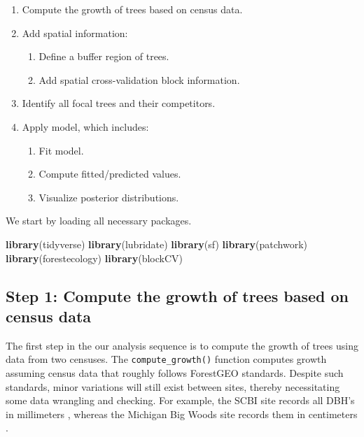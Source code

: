 \documentclass[12pt]{article}
\providecommand{\tightlist}{%
  \setlength{\itemsep}{0pt}\setlength{\parskip}{0pt}}
\newenvironment{Shaded}{\begin{snugshade}}{\end{snugshade}}
\newcommand{\KeywordTok}[1]{\textcolor[rgb]{0.13,0.29,0.53}{\textbf{#1}}}
\newcommand{\NormalTok}[1]{#1}
\begin{document}
\begin{enumerate}
\def\labelenumi{\arabic{enumi}.}
\tightlist
\item
  Compute the growth of trees based on census data.
\item
  Add spatial information:

  \begin{enumerate}
  \def\labelenumii{\arabic{enumii}.}
  \tightlist
  \item
    Define a buffer region of trees.
  \item
    Add spatial cross-validation block information.
  \end{enumerate}
\item
  Identify all focal trees and their competitors.
\item
  Apply model, which includes:

  \begin{enumerate}
  \def\labelenumii{\arabic{enumii}.}
  \tightlist
  \item
    Fit model.
  \item
    Compute fitted/predicted values.
  \item
    Visualize posterior distributions.
  \end{enumerate}
\end{enumerate}

We start by loading all necessary packages.

\begin{Shaded}
\begin{Highlighting}[]
\KeywordTok{library}\NormalTok{(tidyverse)}
\KeywordTok{library}\NormalTok{(lubridate)}
\KeywordTok{library}\NormalTok{(sf)}
\KeywordTok{library}\NormalTok{(patchwork)}
\KeywordTok{library}\NormalTok{(forestecology)}
\KeywordTok{library}\NormalTok{(blockCV)}
\end{Highlighting}
\end{Shaded}

\hypertarget{step-1-compute-the-growth-of-trees-based-on-census-data}{%
\subsection{Step 1: Compute the growth of trees based on census
data}\label{step-1-compute-the-growth-of-trees-based-on-census-data}}

The first step in the our analysis sequence is to compute the growth of
trees using data from two censuses. The \texttt{compute\_growth()}
function computes growth assuming census data that roughly follows
ForestGEO standards. Despite such standards, minor variations will still
exist between sites, thereby necessitating some data wrangling and
checking. For example, the SCBI site records all DBH's in millimeters
\citet{bourg_initial_2013}, whereas the Michigan Big Woods site records
them in centimeters \citet{allen_michigan_2020}.
\end{document}
